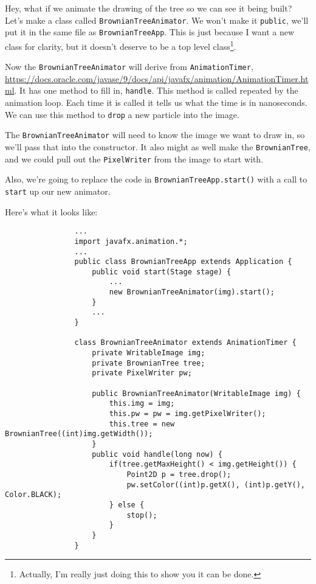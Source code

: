 \documentclass{article}
\begin{document}
            Hey, what if we animate the drawing of the tree so we can see it being built? Let's make a class called
            \texttt{BrownianTreeAnimator}. We won't make it \texttt{public}, we'll put it in the same file as \texttt{BrownianTreeApp}.
            This is just because I want a new class for clarity, but it doesn't deserve to be a top level class\footnote{Actually, I'm
            really just doing this to show you it can be done.}.
            
            Now the \texttt{BrownianTreeAnimator} will derive from \texttt{AnimationTimer},
            \url{https://docs.oracle.com/javase/9/docs/api/javafx/animation/AnimationTimer.html}. It has one method to fill in,
            \texttt{handle}. This method is called repeated by the animation loop. Each time it is called it tells us what the time is in
            nanoseconds.  We can use this method to \texttt{drop} a new particle into the image.
            
            The \texttt{BrownianTreeAnimator} will need to know the image we want to draw in, so we'll pass that into the constructor. It
            also might as well make the \texttt{BrownianTree}, and we could pull out the \texttt{PixelWriter} from the image to start with.
            
            Also, we're going to replace the code in \texttt{BrownianTreeApp.start()} with a call to \texttt{start} up our new animator.
            
            Here's what it looks like:
            
            \begin{verbatim}
                ...            
                import javafx.animation.*;
                ...
                public class BrownianTreeApp extends Application {
                    public void start(Stage stage) {
                        ...
                        new BrownianTreeAnimator(img).start();
                    }
                    ...
                }
                
                class BrownianTreeAnimator extends AnimationTimer {
                    private WritableImage img;
                    private BrownianTree tree;
                    private PixelWriter pw;

                    public BrownianTreeAnimator(WritableImage img) {
                        this.img = img;
                        this.pw = pw = img.getPixelWriter();
                        this.tree = new BrownianTree((int)img.getWidth());
                    }
                    public void handle(long now) {
                        if(tree.getMaxHeight() < img.getHeight()) {
                            Point2D p = tree.drop();
                            pw.setColor((int)p.getX(), (int)p.getY(), Color.BLACK);
                        } else {
                            stop();
                        }
                    }
                }
            \end{verbatim}
\end{document}
